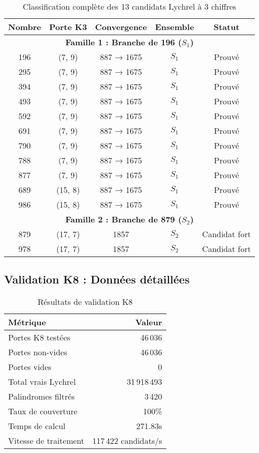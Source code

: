 \documentclass[12pt,a4paper]{article}
\theoremstyle{remark}
\begin{document}
\begin{table}[h]
\centering
\caption{Classification complète des 13 candidats Lychrel à 3 chiffres}
\begin{tabular}{ccccc}
\toprule
\textbf{Nombre} & \textbf{Porte K3} & \textbf{Convergence} & \textbf{Ensemble} & \textbf{Statut}\\
\midrule
\multicolumn{5}{c}{\textbf{Famille 1 : Branche de 196 ($S_1$)}}\\
\midrule
196 & (7, 9) & 887 → 1675 & $S_1$ & Prouvé\\
295 & (7, 9) & 887 → 1675 & $S_1$ & Prouvé\\
394 & (7, 9) & 887 → 1675 & $S_1$ & Prouvé\\
493 & (7, 9) & 887 → 1675 & $S_1$ & Prouvé\\
592 & (7, 9) & 887 → 1675 & $S_1$ & Prouvé\\
691 & (7, 9) & 887 → 1675 & $S_1$ & Prouvé\\
790 & (7, 9) & 887 → 1675 & $S_1$ & Prouvé\\
788 & (7, 9) & 887 → 1675 & $S_1$ & Prouvé\\
877 & (7, 9) & 887 → 1675 & $S_1$ & Prouvé\\
689 & (15, 8) & 887 → 1675 & $S_1$ & Prouvé\\
986 & (15, 8) & 887 → 1675 & $S_1$ & Prouvé\\
\midrule
\multicolumn{5}{c}{\textbf{Famille 2 : Branche de 879 ($S_2$)}}\\
\midrule
879 & (17, 7) & 1857 & $S_2$ & Candidat fort\\
978 & (17, 7) & 1857 & $S_2$ & Candidat fort\\
\bottomrule
\end{tabular}
\end{table}

\subsection{Validation K8 : Données détaillées}

\begin{table}[h]
\centering
\caption{Résultats de validation K8}
\begin{tabular}{lr}
\toprule
\textbf{Métrique} & \textbf{Valeur} \\
\midrule
Portes K8 testées & 46\,036 \\
Portes non-vides & 46\,036 \\
Portes vides & 0 \\
Total vrais Lychrel & 31\,918\,493\\
Palindromes filtrés & 3\,420 \\
Taux de couverture & 100\% \\
Temps de calcul & 271.83s \\
Vitesse de traitement & 117\,422 candidats/s \\
\bottomrule
\end{tabular}
\end{table}
\end{document}
